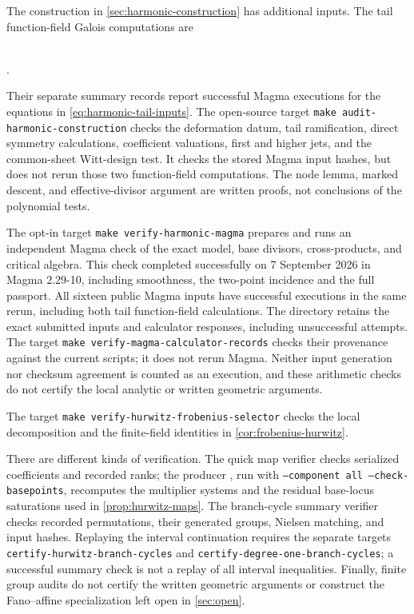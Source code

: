 \documentclass[11pt]{amsart}
\theoremstyle{definition}
\theoremstyle{remark}
\begin{document}
The construction in \cref{sec:harmonic-construction} has additional
inputs.  The tail function-field Galois computations are
\begin{center}
\begin{minipage}{\textwidth}
\centering\small
{}\\
.
\end{minipage}
\end{center}
Their separate summary records report successful Magma executions
for the equations in \cref{eq:harmonic-tail-inputs}.
The open-source target \texttt{make audit-harmonic-construction}
checks the deformation datum, tail ramification, direct symmetry
calculations, coefficient valuations, first and higher jets, and
the common-sheet Witt-design test.  It checks the stored Magma input
hashes, but does not rerun those two function-field computations.
The node lemma, marked descent, and effective-divisor argument are
written proofs, not conclusions of the polynomial tests.

The opt-in target \texttt{make verify-harmonic-magma} prepares and
runs an independent Magma check of the exact model, base divisors,
cross-products, and critical algebra.  This check completed successfully
on 7 September 2026 in Magma 2.29-10, including smoothness, the two-point
incidence and the full passport.  All sixteen public Magma inputs have
successful executions in the same rerun, including both tail
function-field calculations.  The directory
 retains the exact submitted
inputs and calculator responses, including unsuccessful attempts.
The target \texttt{make verify-magma-calculator-records} checks their
provenance against the current scripts; it does not rerun Magma.
Neither input generation nor checksum agreement is counted as an
execution, and these arithmetic checks do not certify the local
analytic or written geometric arguments.

The target \texttt{make verify-hurwitz-frobenius-selector} checks the
local decomposition and the finite-field identities in
\cref{cor:frobenius-hurwitz}.

There are different kinds of verification.  The quick map verifier checks
serialized coefficients and recorded ranks; the producer
, run with
\texttt{--component all --check-basepoints}, recomputes the multiplier
systems and the residual base-locus saturations used in
\cref{prop:hurwitz-maps}.  The branch-cycle summary verifier checks
recorded permutations, their generated groups, Nielsen matching, and
input hashes.  Replaying the interval continuation requires the separate
targets \texttt{certify-hurwitz-branch-cycles} and
\texttt{certify-degree-one-branch-cycles}; a successful summary check is
not a replay of all interval inequalities.  Finally, finite group audits
do not certify the written geometric arguments or construct the
Fano--affine specialization left open in \cref{sec:open}.
\end{document}
